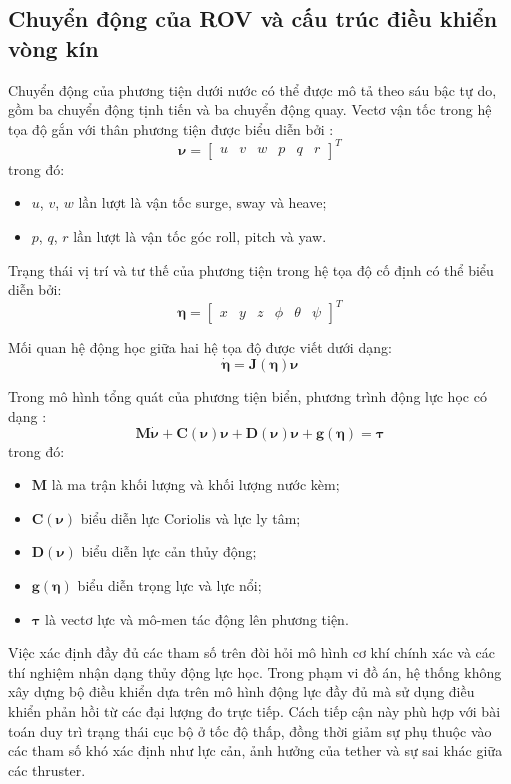\documentclass[../DoAn.tex]{subfiles}
\begin{document}
\subsection{Chuyển động của ROV và cấu trúc điều khiển vòng kín}

Chuyển động của phương tiện dưới nước có thể được mô tả theo sáu bậc tự do, gồm ba chuyển động tịnh tiến và ba chuyển động quay. Vectơ vận tốc trong hệ tọa độ gắn với thân phương tiện được biểu diễn bởi \cite{fossen2021}:
\[
\boldsymbol{\nu} = 
\begin{bmatrix}
u & v & w & p & q & r
\end{bmatrix}^{T}
\]
trong đó:
\begin{itemize}
    \item $u$, $v$, $w$ lần lượt là vận tốc surge, sway và heave;
    \item $p$, $q$, $r$ lần lượt là vận tốc góc roll, pitch và yaw.
\end{itemize}

Trạng thái vị trí và tư thế của phương tiện trong hệ tọa độ cố định có thể biểu diễn bởi:
\[
\boldsymbol{\eta} = 
\begin{bmatrix}
x & y & z & \phi & \theta & \psi
\end{bmatrix}^{T}
\]

Mối quan hệ động học giữa hai hệ tọa độ được viết dưới dạng:
\[
\dot{\boldsymbol{\eta}} = \boldsymbol{J}(\boldsymbol{\eta})\boldsymbol{\nu}
\]

Trong mô hình tổng quát của phương tiện biển, phương trình động lực học có dạng \cite{fossen2021}:
\[
\boldsymbol{M}\dot{\boldsymbol{\nu}} + \boldsymbol{C}(\boldsymbol{\nu})\boldsymbol{\nu} + \boldsymbol{D}(\boldsymbol{\nu})\boldsymbol{\nu} + \boldsymbol{g}(\boldsymbol{\eta}) = \boldsymbol{\tau}
\]
trong đó:
\begin{itemize}
    \item $\boldsymbol{M}$ là ma trận khối lượng và khối lượng nước kèm;
    \item $\boldsymbol{C}(\boldsymbol{\nu})$ biểu diễn lực Coriolis và lực ly tâm;
    \item $\boldsymbol{D}(\boldsymbol{\nu})$ biểu diễn lực cản thủy động;
    \item $\boldsymbol{g}(\boldsymbol{\eta})$ biểu diễn trọng lực và lực nổi;
    \item $\boldsymbol{\tau}$ là vectơ lực và mô-men tác động lên phương tiện.
\end{itemize}

Việc xác định đầy đủ các tham số trên đòi hỏi mô hình cơ khí chính xác và các thí nghiệm nhận dạng thủy động lực học. Trong phạm vi đồ án, hệ thống không xây dựng bộ điều khiển dựa trên mô hình động lực đầy đủ mà sử dụng điều khiển phản hồi từ các đại lượng đo trực tiếp. Cách tiếp cận này phù hợp với bài toán duy trì trạng thái cục bộ ở tốc độ thấp, đồng thời giảm sự phụ thuộc vào các tham số khó xác định như lực cản, ảnh hưởng của tether và sự sai khác giữa các thruster.
\end{document}
